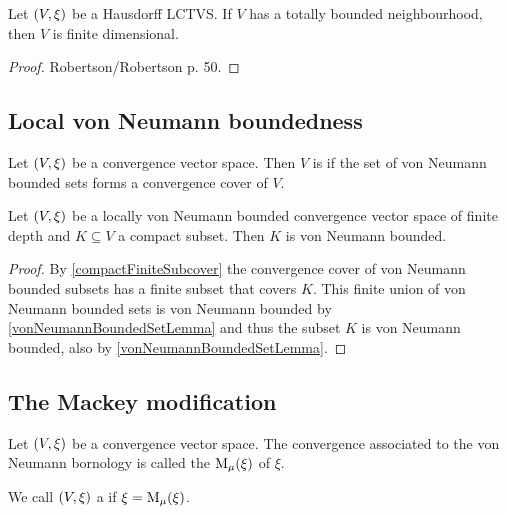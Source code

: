 \begin{proposition}
Let $\sSet{V, \xi}$ be a Hausdorff LCTVS. If $V$ has a totally bounded neighbourhood, then $V$ is finite dimensional.
\end{proposition}
\begin{proof}
Robertson/Robertson p. 50.
\end{proof}


\subsection{Local von Neumann boundedness}
\begin{definition}
Let $\sSet{V,\xi}$ be a convergence vector space. Then $V$ is  if the set of von Neumann bounded sets forms a convergence cover of $V$.
\end{definition}

\begin{proposition}
Let $\sSet{V,\xi}$ be a locally von Neumann bounded convergence vector space of finite depth and $K\subseteq V$ a compact subset. Then $K$ is von Neumann bounded.
\end{proposition}
\begin{proof}
By \ref{compactFiniteSubcover} the convergence cover of von Neumann bounded subsets has a finite subset that covers $K$. This finite union of von Neumann bounded sets is von Neumann bounded by \ref{vonNeumannBoundedSetLemma} and thus the subset $K$ is von Neumann bounded, also by \ref{vonNeumannBoundedSetLemma}.
\end{proof}

\subsection{The Mackey modification}
\begin{definition}
Let $\sSet{V,\xi}$ be a convergence vector space. The convergence associated to the von Neumann bornology is called the  $\operatorname{M_\mu}(\xi)$ of $\xi$.

We call $\sSet{V, \xi}$ a  if $\xi = \operatorname{M_\mu}(\xi)$.
\end{definition}

